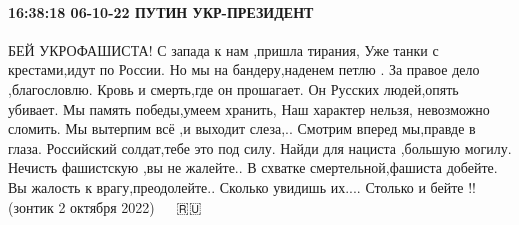 \paragraph{16:38:18 06-10-22 ПУТИН УКР-ПРЕЗИДЕНТ}
БЕЙ УКРОФАШИСТА!
С запада к нам ,пришла тирания,
Уже танки с крестами,идут по России.
Но мы на бандеру,наденем петлю .
За правое дело ,благословлю.
Кровь и смерть,где он прошагает.
Он Русских людей,опять убивает.
Мы память победы,умеем хранить,
Наш характер нельзя, невозможно сломить.
Мы вытерпим всё ,и выходит слеза,..
Смотрим вперед мы,правде в глаза.
Российский солдат,тебе это под силу.
Найди для нациста ,большую могилу.
Нечисть фашистскую ,вы не жалейте..
В схватке смертельной,фашиста добейте.
Вы жалость к врагу,преодолейте..
Сколько увидишь их....
Столько и бейте !!
(зонтик 2 октября 2022)
👊 👊 🇷🇺

